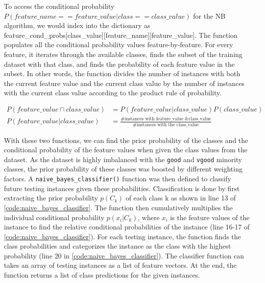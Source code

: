 \documentclass[a4paper]{article}
\begin{document}
To access the conditional probability $P(feature\_name==feature\_value|class==class\_value)$ for the NB algorithm, we would index into the dictionary as feature\_cond\_probs[class\_value][feature\_name][feature\_value]. The function populates all the conditional probability values feature-by-feature. For every feature, it iterates through the available classes, finds the subset of the training dataset with that class, and finds the probability of each feature value in the subset. In other words, the function divides the number of instances with both the current feature value and the current class value by the number of instances with the current class value according to the product rule of probability.

\begin{equation}
  \begin{aligned}
    P(feature\_value \cap class\_value) &= P(feature\_value|class\_value)P(class\_value)\\
    P(feature\_value|class\_value) &= \frac{\text{\# instances with feature\_value \& class\_value}}{\text{\# instances with the class\_value}}
  \end{aligned} 
\end{equation}

With these two functions, we can find the prior probability of the classes and the conditional probability of the feature values when given the class values from the dataset. As the dataset is highly imbalanced with the \lstinline{good} and \lstinline{vgood} minority classes, the prior probability of these classes was boosted by different weighting factors. A \lstinline{naive_bayes_classifier()} function was then defined to classify future testing instances given these probabilities. Classification is done by first extracting the prior probability $p(C_k)$ of each class k as shown in line 13 of \autoref{code:naive_bayes_classifier}. The function then cumulatively multiplies the individual conditional probability $p(x_i|C_k)$, where $x_i$ is the feature values of the instance to find the relative conditional probabilities of the instance (line 16-17 of \autoref{code:naive_bayes_classifier}). For each testing instance, the function finds the class probabilities and categorizes the instance as the class with the highest probability (line 20 in \autoref{code:naive_bayes_classifier}). The classifier function can takes an array of testing instances as a list of feature vectors. At the end, the function returns a list of class predictions for the given instances.
\end{document}
